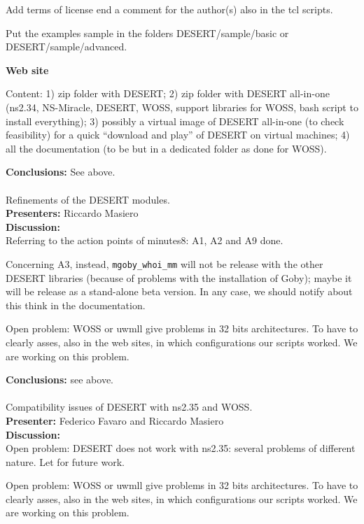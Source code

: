 \documentclass[11pt,journal,draftclsnofoot,onecolumn,twoside,letterpaper]{IEEEtran}
\theoremstyle{definition} \newtheorem{definition}[]{Definition}
\theoremstyle{theorem} \newtheorem{theorem}[]{Theorem}
\begin{document}
Add terms of license end a comment for the author(s) also in the tcl scripts. 

Put the examples sample in the folders DESERT/sample/basic or DESERT/sample/advanced.

{\bf Web site}

Content: 1) zip folder with DESERT; 2) zip folder with DESERT all-in-one (ns2.34, NS-Miracle, DESERT, WOSS, support libraries for WOSS, bash script to install everything); 3) possibly a virtual image of DESERT all-in-one (to check feasibility) for a quick ``download and play'' of DESERT on virtual machines; 4) all the documentation (to be but in a dedicated folder as done for WOSS).

{\bf Conclusions:} See above.\\

\  \\

 Refinements of the DESERT modules.\\
{\bf Presenters:} Riccardo Masiero\\
{\bf Discussion:}\\

Referring to the action points of minutes8: A1, A2 and A9 done. 

Concerning A3, instead, {\tt mgoby\_whoi\_mm} will not be release with the other DESERT libraries (because of problems with the installation of Goby); maybe it will be release as a stand-alone beta version. In any case, we should notify about this think in the documentation.

Open problem: WOSS or uwmll give problems in 32 bits architectures. To have to clearly asses, also in the web sites, in which configurations our scripts worked. We are working on this problem.

{\bf Conclusions:} see above.\\

\  \\
 Compatibility issues of DESERT with ns2.35 and WOSS.\\
{\bf Presenter:} Federico Favaro and Riccardo Masiero\\
{\bf Discussion:} \\

Open problem: DESERT does not work with ns2.35: several problems of different nature. Let for future work.

Open problem: WOSS or uwmll give problems in 32 bits architectures. To have to clearly asses, also in the web sites, in which configurations our scripts worked. We are working on this problem.
\end{document}
